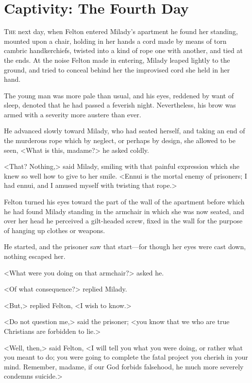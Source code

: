 
\chapter{Captivity: The Fourth Day}

\lettrine[]{T}{he} next day, when Felton entered Milady's apartment he found her standing, mounted upon a chair, holding in her hands a cord made by means of torn cambric handkerchiefs, twisted into a kind of rope one with another, and tied at the ends. At the noise Felton made in entering, Milady leaped lightly to the ground, and tried to conceal behind her the improvised cord she held in her hand. 

The young man was more pale than usual, and his eyes, reddened by want of sleep, denoted that he had passed a feverish night. Nevertheless, his brow was armed with a severity more austere than ever. 

He advanced slowly toward Milady, who had seated herself, and taking an end of the murderous rope which by neglect, or perhaps by design, she allowed to be seen, <What is this, madame?> he asked coldly. 

<That? Nothing,> said Milady, smiling with that painful expression which she knew so well how to give to her smile. <Ennui is the mortal enemy of prisoners; I had ennui, and I amused myself with twisting that rope.> 

Felton turned his eyes toward the part of the wall of the apartment before which he had found Milady standing in the armchair in which she was now seated, and over her head he perceived a gilt-headed screw, fixed in the wall for the purpose of hanging up clothes or weapons. 

He started, and the prisoner saw that start---for though her eyes were cast down, nothing escaped her. 

<What were you doing on that armchair?> asked he. 

<Of what consequence?> replied Milady. 

<But,> replied Felton, <I wish to know.> 

<Do not question me,> said the prisoner; <you know that we who are true Christians are forbidden to lie.> 

<Well, then,> said Felton, <I will tell you what you were doing, or rather what you meant to do; you were going to complete the fatal project you cherish in your mind. Remember, madame, if our God forbids falsehood, he much more severely condemns suicide.> 

